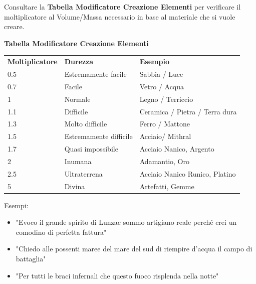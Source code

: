 \documentclass[a4paper,11pt,twoside,openany]{book}
\begin{document}
\bigskip

Consultare la \textbf{Tabella Modificatore Creazione Elementi} per verificare il moltiplicatore al Volume/Massa necessario in base al materiale che si vuole creare.

\bigskip

\textbf{Tabella Modificatore Creazione Elementi}

\medskip
\begin{tabular}{lll}
	\toprule
	\textbf{Moltiplicatore} & \textbf{Durezza}       & \textbf{Esempio}\\
	0.5                   & Estremamente facile    & Sabbia / Luce \\
	0.7                   & Facile                 & Vetro / Acqua\\
	1                     & Normale                & Legno / Terriccio\\
	1.1                   & Difficile              & Ceramica / Pietra / Terra dura\\
	1.3                   & Molto difficile        & Ferro / Mattone\\
	1.5                   & Estremamente difficile & Acciaio/ Mithral\\
	1.7                   & Quasi impossibile      & Acciaio Nanico, Argento\\
	2                     & Inumana                & Adamantio, Oro\\
	2.5                   & Ultraterrena           & Acciaio Nanico Runico, Platino\\
	5                     & Divina                 & Artefatti, Gemme\\
\end{tabular}


Esempi:
\begin{itemize}
	\item "Evoco il grande spirito di Lunzac sommo artigiano reale perché crei un comodino di perfetta fattura"
	\item "Chiedo alle possenti maree del mare del sud di riempire d'acqua il campo di battaglia"
	\item "Per tutti le braci infernali che questo fuoco risplenda nella notte"
\end{itemize}

\bigskip
\end{document}
